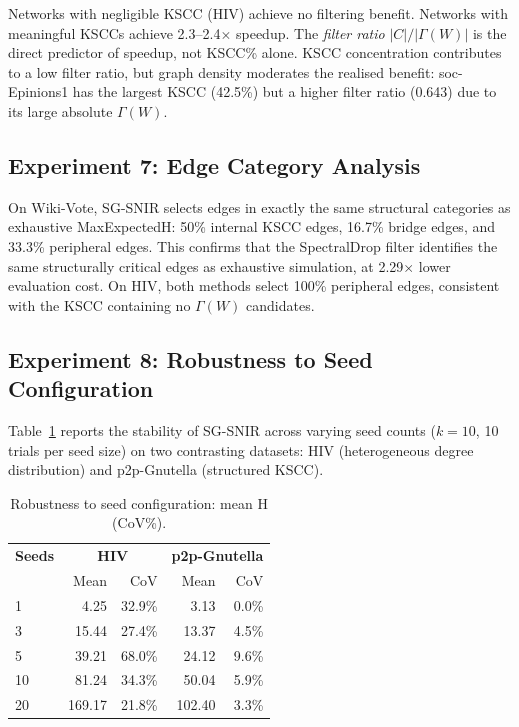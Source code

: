 \documentclass[conference]{IEEEtran}
\begin{document}
Networks with negligible KSCC (HIV) achieve no filtering benefit. Networks with meaningful KSCCs achieve 2.3--2.4$\times$ speedup. The \emph{filter ratio} $|C|/|\Gamma(W)|$ is the direct predictor of speedup, not KSCC\% alone. KSCC concentration contributes to a low filter ratio, but graph density moderates the realised benefit: soc-Epinions1 has the largest KSCC (42.5\%) but a higher filter ratio (0.643) due to its large absolute $\Gamma(W)$.

\subsection{Experiment 7: Edge Category Analysis}

On Wiki-Vote, SG-SNIR selects edges in exactly the same structural categories as exhaustive MaxExpectedH: 50\% internal KSCC edges, 16.7\% bridge edges, and 33.3\% peripheral edges. This confirms that the SpectralDrop filter identifies the same structurally critical edges as exhaustive simulation, at 2.29$\times$ lower evaluation cost. On HIV, both methods select 100\% peripheral edges, consistent with the KSCC containing no $\Gamma(W)$ candidates.

\subsection{Experiment 8: Robustness to Seed Configuration}

Table~\ref{tab:robustness} reports the stability of SG-SNIR across varying seed counts ($k=10$, 10 trials per seed size) on two contrasting datasets: HIV (heterogeneous degree distribution) and p2p-Gnutella (structured KSCC).

\begin{table}[htbp]
\caption{Robustness to seed configuration: mean H (CoV\%).}
\label{tab:robustness}
\centering
\begin{tabular}{lrrrr}
\hline
\textbf{Seeds} & \multicolumn{2}{c}{\textbf{HIV}} & \multicolumn{2}{c}{\textbf{p2p-Gnutella}} \\
 & Mean & CoV & Mean & CoV \\
\hline
1 & 4.25 & 32.9\% & 3.13 & 0.0\% \\
3 & 15.44 & 27.4\% & 13.37 & 4.5\% \\
5 & 39.21 & 68.0\% & 24.12 & 9.6\% \\
10 & 81.24 & 34.3\% & 50.04 & 5.9\% \\
20 & 169.17 & 21.8\% & 102.40 & 3.3\% \\
\hline
\end{tabular}
\end{table}
\end{document}
